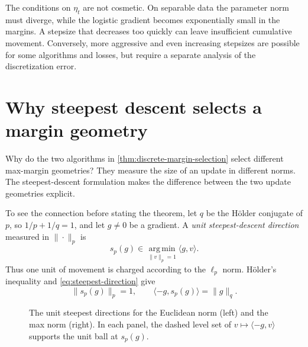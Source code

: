 \documentclass[11pt,twoside]{article}
\newcommand{\argmin}{\operatorname*{arg\,min}}
\theoremstyle{definition}
\theoremstyle{remark}
\begin{document}
The conditions on $\eta_t$ are not cosmetic. On separable data the parameter
norm must diverge, while the logistic gradient becomes exponentially small in
the margins. A stepsize that decreases too quickly can leave insufficient
cumulative movement. Conversely, more aggressive and even increasing
stepsizes are possible for some algorithms and losses, but require a separate
analysis of the discretization error.

\section{Why steepest descent selects a margin geometry}
\label{sec:steepest-flow}

Why do the two algorithms in \cref{thm:discrete-margin-selection} select
different max-margin geometries? They measure the size of an update in
different norms.
The steepest-descent formulation makes the difference between the two update
geometries explicit.

To see the connection before stating the theorem, let $q$ be the H\"older
conjugate of $p$, so $1/p+1/q=1$, and let $g\ne0$ be a gradient. A
\emph{unit steepest-descent direction} measured in $\|\cdot\|_p$ is
\begin{equation}
 s_p(g)\in\argmin_{\|v\|_p=1}\langle g,v\rangle.
 \label{eq:steepest-direction}
\end{equation}
Thus one unit of movement is charged according to the $\ell_p$ norm.
H\"older's inequality and \cref{eq:steepest-direction} give
\begin{equation}
 \|s_p(g)\|_p=1,
 \qquad
 \langle-g,s_p(g)\rangle=\|g\|_q.
 \label{eq:steepest-identities}
\end{equation}

\begin{figure}[H]
\centering
\hfill
{}
\hfill
{}
\hfill\mbox{}
\caption{The unit steepest directions for the Euclidean norm (left) and the
max norm (right). In each panel, the dashed level set of
$v\mapsto\langle-g,v\rangle$ supports the unit ball at $s_p(g)$.}
\label{fig:steepest-directions}
\end{figure}
\end{document}
